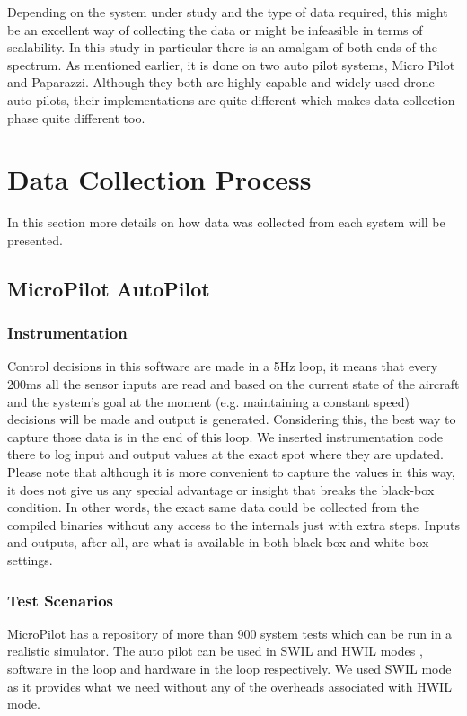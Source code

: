 Depending on the system under study and the type of data required, this might be an excellent way of collecting the data or might be infeasible in terms of scalability. \cite{mashhadi2019empirical} 
In this study in particular there is an amalgam of both ends of the spectrum. As mentioned earlier, it is done on two auto pilot systems, Micro Pilot and Paparazzi. \cite{hattenberger2014using}
Although they both are highly capable and widely used drone auto pilots, their implementations are quite different which makes data collection phase quite different too.

\section{Data Collection Process}
In this section more details on how data was collected from each system will be presented. 

\subsection{MicroPilot AutoPilot}

\subsubsection{Instrumentation}
Control decisions in this software are made in a 5Hz loop, it means that every 200ms all the sensor inputs are read and based on the current state of the aircraft and the system's goal at the moment (e.g. maintaining a constant speed) decisions will be made and output is generated. Considering this, the best way to capture those data is in the end of this loop. We inserted instrumentation code there to log input and output values at the exact spot where they are updated. 
Please note that although it is more convenient to capture the values in this way, it does not give us any special advantage or insight that breaks the black-box condition. In other words, the exact same data could be collected from the compiled binaries without any access to the internals just with extra steps. Inputs and outputs, after all, are what is available in both black-box and white-box settings.

\subsubsection{Test Scenarios}
MicroPilot has a repository of more than 900 system tests which can be run in a realistic simulator. The auto pilot can be used in SWIL and HWIL modes \cite{melmoth2019true}, software in the loop and hardware in the loop respectively. We used SWIL mode as it provides what we need without any of the overheads associated with HWIL mode. 

